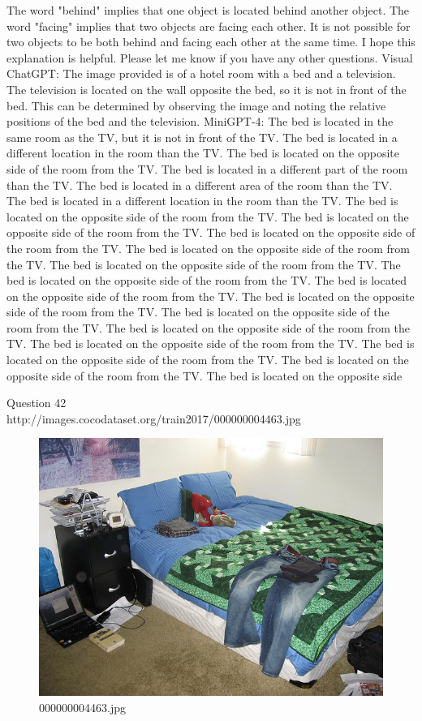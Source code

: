 \begin{enumerate}
    The word "behind" implies that one object is located behind another object.
    The word "facing" implies that two objects are facing each other.
    It is not possible for two objects to be both behind and facing each other at the same time.
    I hope this explanation is helpful. Please let me know if you have any other questions.
    \subitem Visual ChatGPT: The image provided is of a hotel room with a bed and a television. The television is located on the wall opposite the bed, so it is not in front of the bed. This can be determined by observing the image and noting the relative positions of the bed and the television.
    \subitem MiniGPT-4: The bed is located in the same room as the TV, but it is not in front of the TV. The bed is located in a different location in the room than the TV. The bed is located on the opposite side of the room from the TV. The bed is located in a different part of the room than the TV. The bed is located in a different area of the room than the TV. The bed is located in a different location in the room than the TV. The bed is located on the opposite side of the room from the TV. The bed is located on the opposite side of the room from the TV. The bed is located on the opposite side of the room from the TV. The bed is located on the opposite side of the room from the TV. The bed is located on the opposite side of the room from the TV. The bed is located on the opposite side of the room from the TV. The bed is located on the opposite side of the room from the TV. The bed is located on the opposite side of the room from the TV. The bed is located on the opposite side of the room from the TV. The bed is located on the opposite side of the room from the TV. The bed is located on the opposite side of the room from the TV. The bed is located on the opposite side of the room from the TV. The bed is located on the opposite side of the room from the TV. The bed is located on the opposite side
\end{enumerate}
Question 42\\
http://images.cocodataset.org/train2017/000000004463.jpg
\begin{figure}[h]
    \centering
    \includegraphics[width=0.8\linewidth]{../image set/hard/000000004463.jpg}
    \caption{000000004463.jpg}
\end{figure}
